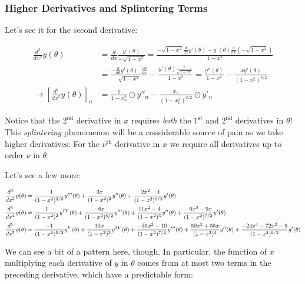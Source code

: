 \documentclass[10pt]{article}
\begin{document}
\subsubsection{Higher Derivatives and Splintering Terms}

Let's see it for the second derivative:

\begin{align*}
\frac{d^2}{dx^2} y(\theta) &= \frac{d}{dx} \frac{y'(\theta)}{-\sqrt{1-x^2}} = \frac{-\sqrt{1-x^2} \frac{d}{dx} y'(\theta) - y'(\theta) \frac{d}{dx} (-\sqrt{1-x^2})}{1 - x^2} \\
&= \frac{-\frac{d}{d\theta}y'(\theta)\cdot \frac{d\theta}{dx}}{\sqrt{1-x^2}} - \frac{y'(\theta)\frac{x}{\sqrt{1-x^2}}}{1 - x^2} = \frac{y''(\theta)}{1-x^2} - \frac{x y'(\theta)}{(1 - x^2)^{3/2}} \\
\rightarrow [\frac{d^2}{dx^2} y(\theta)]_n &= \frac{1}{1-x_n^2} \odot y''_n - \frac{x_n}{(1 - x_n^2)^{3/2}} \odot y'_n
\end{align*}

Notice that the $2^\text{nd}$ derivative in $x$ requires \textit{both} the $1^\text{st}$ and $2^\text{nd}$ derivatives in $\theta$! This \textit{splintering} phenomenon will be a considerable source of pain as we take higher derivatives: For the $\nu^\text{th}$ derivative in $x$ we require all derivatives up to order $\nu$ in $\theta$.

Let's see a few more:

\begin{equation}\label{derivatives}
\footnotesize
\begin{aligned}
\frac{d^3}{dx^3} y(\theta) &= \frac{-1}{(1-x^2)^{3/2}} y'''(\theta) + \frac{3x}{(1-x^2)^2} y''(\theta) + \frac{-2x^2 - 1}{(1-x^2)^{5/2}} y'(\theta)\\
\frac{d^4}{dx^4} y(\theta) &= \frac{1}{(1-x^2)^2} y^{IV}(\theta) + \frac{-6x}{(1-x^2)^{5/2}} y'''(\theta) + \frac{11x^2 + 4}{(1-x^2)^3} y''(\theta) + \frac{-6x^3 - 9x}{(1-x^2)^{7/2}} y'(\theta)\\
\frac{d^5}{dx^5} y(\theta) &= \frac{-1}{(1-x^2)^{5/2}} y^V(\theta) + \frac{10x}{(1-x^2)^3} y^{IV}(\theta) + \frac{-35x^2-10}{(1-x^2)^{7/2}} y'''(\theta) + \frac{50x^2 + 55x}{(1-x^2)^4} y''(\theta) + \frac{-24x^4 -72x^2 - 9}{(1-x^2)^{9/2}} y'(\theta)\\
\end{aligned}
\normalsize
\end{equation}

We can see a bit of a pattern here, though. In particular, the function of $x$ multiplying each derivative of $y$ in $\theta$ comes from at most two terms in the preceding derivative, which have a predictable form:\vspace{-2mm}
\end{document}
